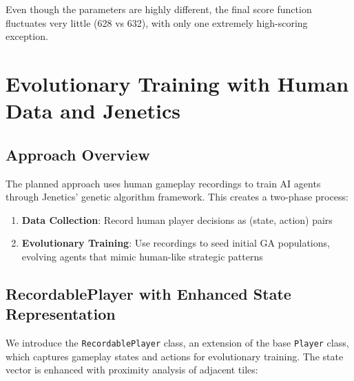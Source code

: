 \documentclass[sigconf]{acmart} %
\begin{document}
Even though the parameters are highly different, the final score function fluctuates very little (628 vs 632), with only one extremely high-scoring exception.


\section{Evolutionary Training with Human Data and Jenetics}
\label{sec:evo_train}  %
\subsection{Approach Overview}
The planned approach uses human gameplay recordings to train AI agents through Jenetics' genetic algorithm framework. This creates a two-phase process:
\begin{enumerate}
	\item \textbf{Data Collection}: Record human player decisions as (state, action) pairs
	\item \textbf{Evolutionary Training}: Use recordings to seed initial GA populations, evolving agents that mimic human-like strategic patterns
\end{enumerate}

\subsection{RecordablePlayer with Enhanced State Representation}
\label{subsec:recordable_player}

We introduce the \texttt{RecordablePlayer} class, an extension of the base \texttt{Player} class, which captures gameplay states and actions for evolutionary training. The state vector is enhanced with proximity analysis of adjacent tiles:
\end{document}
